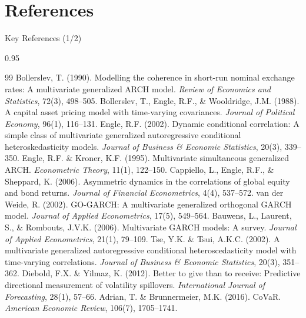 \documentclass[9pt, aspectratio=169, t]{beamer}
\begin{document}
\section{References}

\begin{frame}{Key References (1/2)}
    \begin{cminipage}{0.95\textwidth}
    \vspace{-3mm}
    {\tiny
    \begin{thebibliography}{99}\setlength{\itemsep}{0pt}
         Bollerslev, T. (1990). Modelling the coherence in short-run nominal exchange rates: A multivariate generalized ARCH model. \textit{Review of Economics and Statistics}, 72(3), 498--505.
         Bollerslev, T., Engle, R.F., \& Wooldridge, J.M. (1988). A capital asset pricing model with time-varying covariances. \textit{Journal of Political Economy}, 96(1), 116--131.
         Engle, R.F. (2002). Dynamic conditional correlation: A simple class of multivariate generalized autoregressive conditional heteroskedasticity models. \textit{Journal of Business \& Economic Statistics}, 20(3), 339--350.
         Engle, R.F. \& Kroner, K.F. (1995). Multivariate simultaneous generalized ARCH. \textit{Econometric Theory}, 11(1), 122--150.
         Cappiello, L., Engle, R.F., \& Sheppard, K. (2006). Asymmetric dynamics in the correlations of global equity and bond returns. \textit{Journal of Financial Econometrics}, 4(4), 537--572.
         van der Weide, R. (2002). GO-GARCH: A multivariate generalized orthogonal GARCH model. \textit{Journal of Applied Econometrics}, 17(5), 549--564.
         Bauwens, L., Laurent, S., \& Rombouts, J.V.K. (2006). Multivariate GARCH models: A survey. \textit{Journal of Applied Econometrics}, 21(1), 79--109.
         Tse, Y.K. \& Tsui, A.K.C. (2002). A multivariate generalized autoregressive conditional heteroscedasticity model with time-varying correlations. \textit{Journal of Business \& Economic Statistics}, 20(3), 351--362.
         Diebold, F.X. \& Yilmaz, K. (2012). Better to give than to receive: Predictive directional measurement of volatility spillovers. \textit{International Journal of Forecasting}, 28(1), 57--66.
         Adrian, T. \& Brunnermeier, M.K. (2016). CoVaR. \textit{American Economic Review}, 106(7), 1705--1741.
    \end{thebibliography}
    }
    \end{cminipage}
\end{frame}
\end{document}
